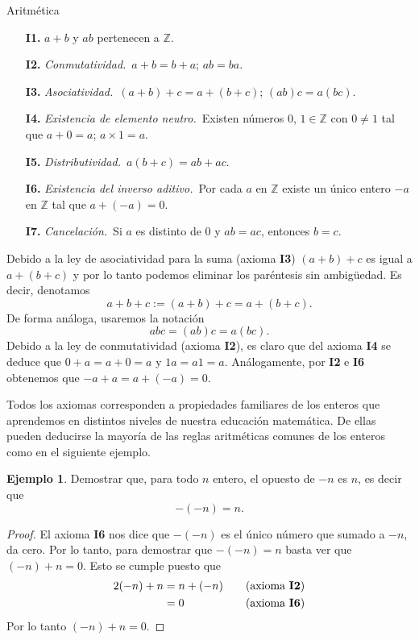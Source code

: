\documentclass[11pt,spanish,makeidx]{amsbook}
\theoremstyle{definition}
\newtheorem{ejemplo}{Ejemplo}[section]
\theoremstyle{remark}
\begin{document}
\begin{section}{Aritmética}
\begin{enumerate}
\item[{\bf I1.}] $a+b$ y $ab$ pertenecen a ${\mathbb Z}$.
\item[{\bf I2.}] {\em Conmutatividad.}\, $a+b = b+a$; $ab=ba$. 
\item[{\bf I3.}] {\em Asociatividad.}\, $(a+b)+c = a+(b+c)$; $(ab)c = a(bc)$. 
\item[{\bf I4.}] {\em Existencia de elemento neutro.}\, Existen números $0$, $1 \in \mathbb Z$ con $0\not=1$ tal que $a+0=a$; $a \times 1=a$. 
\item[{\bf I5.}] {\em Distributividad.}\, $a(b+c)=ab+ac$. 
\item[{\bf I6.}] {\em Existencia del inverso aditivo.}\, Por cada $a$ en ${\mathbb Z}$ existe un único entero $-a$ en ${\mathbb Z}$ tal que $a+(-a)=0$. 
\item[{\bf I7.}] {\em Cancelación.}\, Si $a$ es distinto de 0 y $ab=ac$, entonces $b=c$. 
\end{enumerate}

Debido a la ley de asociatividad para la suma (axioma {\bf I3}) $(a+b)+c$ es igual a $a+(b+c)$ y por lo tanto podemos eliminar los paréntesis sin ambigüedad. Es decir, denotamos
$$
a+b+c := (a+b)+c = a+(b+c).
$$
De forma análoga, usaremos la notación
$$
abc = (ab)c = a(bc).
$$
Debido a la ley de conmutatividad (axioma {\bf I2}), es claro que  del axioma {\bf I4} se deduce que  $0+a=a+0=a$ y $1a = a1=a$. Análogamente,  por  {\bf I2} e  {\bf I6} obtenemos que  $-a+a=a+(-a)=0$.

Todos los axiomas corresponden a propiedades familiares de los  enteros que aprendemos en distintos niveles de nuestra educación  matemática. De ellas pueden deducirse la mayoría de las reglas  aritméticas comunes de los enteros como en el siguiente ejemplo.

\begin{ejemplo}\label{Ej.opuesto_opuesto} Demostrar que, para todo $n$ entero, el opuesto de $-n$ es $n$, es decir que 
$$-(-n) = n.$$ 
\end{ejemplo}
\begin{proof} El axioma {\bf I6} nos dice que $-(-n)$ es el único número que sumado a $-n$, da cero.  Por lo tanto, para demostrar que $-(-n) = n$ basta ver que $(-n)+n=0$. Esto se cumple puesto que 
\begin{alignat*}2
(-n)+n&=n+(-n)& &\text{(axioma {\bf I2})} \\
&=0&\quad &\text{(axioma {\bf I6})}
\end{alignat*}
Por lo tanto  $(-n)+n=0$.
\end{proof}


\end{section}
\end{document}

